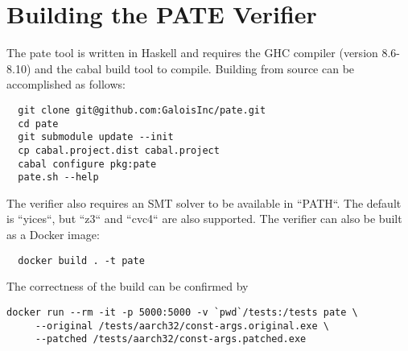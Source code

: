 
\section{Building the PATE Verifier}
\label{sec:build-pate-verif}

The pate tool is written in Haskell and requires the GHC compiler (version 8.6-8.10) and the cabal build tool to compile.
Building from source can be accomplished as follows:
\begin{verbatim}
  git clone git@github.com:GaloisInc/pate.git
  cd pate
  git submodule update --init
  cp cabal.project.dist cabal.project
  cabal configure pkg:pate
  pate.sh --help
\end{verbatim}
The verifier also requires an SMT solver to be available in ``PATH``.
The default is ``yices``, but ``z3`` and ``cvc4`` are also supported.
The verifier can also be built as a Docker image:
\begin{verbatim}
  docker build . -t pate
\end{verbatim}
The correctness of the build can be confirmed by
\begin{verbatim}
docker run --rm -it -p 5000:5000 -v `pwd`/tests:/tests pate \
     --original /tests/aarch32/const-args.original.exe \
     --patched /tests/aarch32/const-args.patched.exe
\end{verbatim}



